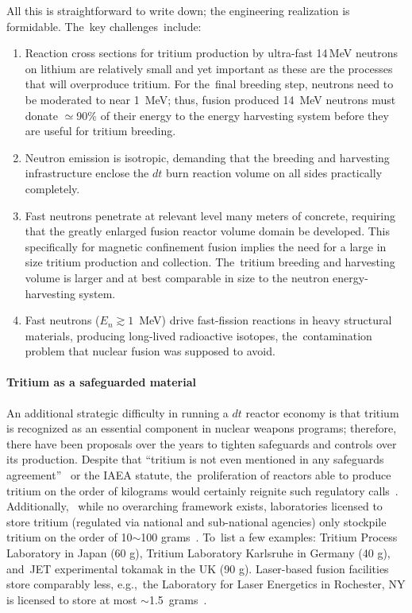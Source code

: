 \documentclass[particles,article,accept,pdftex,moreauthors]{Definitions/mdpi}
\begin{document}
All this is straightforward to write down; the engineering realization is formidable. The~key challenges~include:
\begin{enumerate}
\item Reaction cross sections for tritium production by ultra-fast 14\,MeV neutrons on lithium are relatively small and yet important as these are the processes that will overproduce tritium. For the~final breeding step, neutrons need to be moderated to near 1~MeV; thus, fusion produced 14~MeV neutrons must donate $\simeq$90\% of their energy to the energy harvesting system before they are useful for tritium breeding.
\item Neutron emission is isotropic, demanding that the breeding and harvesting infrastructure enclose the $dt$ burn reaction volume on all sides practically completely.
\item Fast neutrons penetrate at relevant level many meters of concrete, requiring that the greatly enlarged fusion reactor volume domain be developed. This specifically for magnetic confinement fusion implies the need for a large in size tritium production and collection. The~tritium breeding and harvesting volume is larger and at best comparable in size to the neutron energy-harvesting system.
\item Fast neutrons ($E_n \gtrsim 1$~MeV) drive fast-fission reactions in heavy structural materials, producing long-lived radioactive isotopes, the~contamination problem that nuclear fusion was supposed to avoid.
\end{enumerate}

\vspace{-6pt}\paragraph*{\bf Tritium as a safeguarded material}
An additional strategic difficulty in running a $dt$ reactor economy is that tritium is recognized as an essential component in nuclear weapons programs; therefore, there have been proposals over the years to tighten safeguards and controls over its production. Despite that ``tritium is not even mentioned in any safeguards agreement''~\cite{von1990modern} or the IAEA statute, the~proliferation of reactors able to produce tritium on the order of kilograms would certainly reignite such regulatory calls~\cite{dalton2017toward,abdou2021physics}. Additionally, ~while no overarching framework exists, laboratories licensed to store tritium (regulated via national and sub-national agencies) only stockpile tritium on the order of 10$\sim$100 grams~\cite{iaea2024}. To~list a few examples: Tritium Process Laboratory in Japan (60 g), Tritium Laboratory Karlsruhe in Germany (40 g), and~JET experimental tokamak in the UK (90 g). Laser-based fusion facilities store comparably less, e.g.,~the Laboratory for Laser Energetics in Rochester, NY is licensed to store at most $\sim$1.5~grams~\cite{lle_cryogenic_tritium}.
\end{document}
